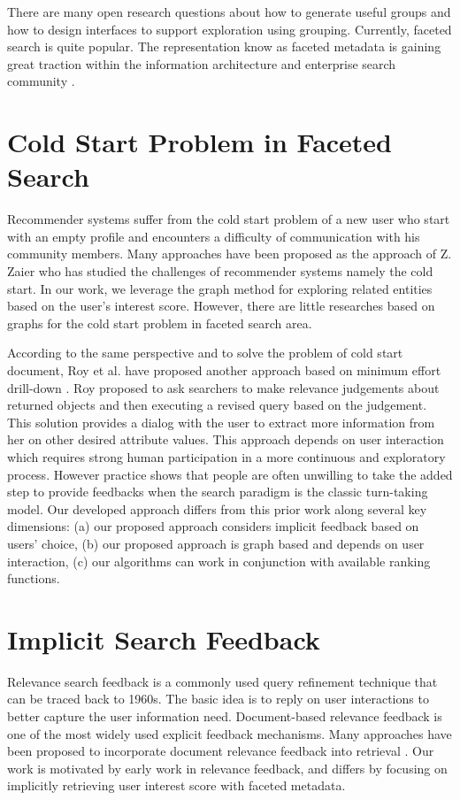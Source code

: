 There are many open research questions about how to generate useful groups and how to design interfaces to support exploration using grouping. Currently, faceted search is quite popular.  The representation know as faceted metadata is gaining great traction within the information architecture and enterprise search community \cite{Yee2003}.

\section{Cold Start Problem in Faceted Search}

Recommender systems suffer from the cold start problem of a new user who start with an empty profile and encounters a difficulty of communication with his community members. Many approaches have been proposed \cite{Leung2007, Gao2002} as the approach of Z. Zaier\cite{Zaier2010} who has studied the challenges of recommender systems namely the cold start. In our work, we leverage the graph method for exploring related entities based on the user's interest score. However, there are little researches based on graphs for the cold start problem in faceted search area. 

According to the same perspective and to solve the problem of cold start document, Roy et al. have proposed another approach based on minimum effort drill-down \cite{Roy2008}. Roy proposed to ask searchers to make relevance judgements about returned objects and then executing a revised query based on the judgement. This solution provides a dialog with the user to extract more information from her on other desired attribute values. This approach depends on user interaction which requires strong human participation in a more continuous and exploratory process. However practice shows that people are often unwilling to take the added step to provide feedbacks when the search paradigm is the classic turn-taking model. Our developed approach differs from this prior work along several key dimensions: (a) our proposed approach considers implicit feedback based on users' choice, (b) our proposed approach is graph based and depends on user interaction, (c) our algorithms can work in conjunction with available ranking functions.

\section{Implicit Search Feedback}

Relevance search feedback is a commonly used query refinement technique that can be traced back to 1960s. The basic idea is to reply on user interactions to better capture the user information need. Document-based relevance feedback is one of the most widely used explicit feedback mechanisms. Many approaches have been proposed to incorporate document relevance feedback into retrieval \cite{Zhai2001, Zhang2004}. Our work is motivated by early work in relevance feedback, and differs by focusing on implicitly retrieving user interest score with faceted metadata.

